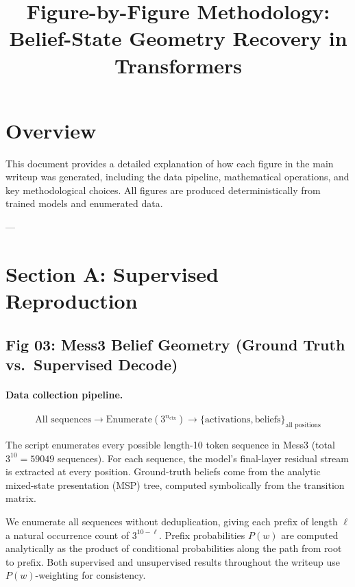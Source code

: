 \documentclass[11pt]{article}
\title{\vspace{-2.5em}Figure-by-Figure Methodology:\\
Belief-State Geometry Recovery in Transformers}
\author{}
\date{}
\begin{document}
\maketitle
\vspace{-3em}

\section*{Overview}

This document provides a detailed explanation of how each figure in the main writeup was generated, including the data pipeline, mathematical operations, and key methodological choices. All figures are produced deterministically from trained models and enumerated data.

---

\section{Section A: Supervised Reproduction}

\subsection{Fig 03: Mess3 Belief Geometry (Ground Truth vs.\ Supervised Decode)}

\paragraph{Data collection pipeline.}
\begin{equation}
\text{All sequences} \to \text{Enumerate}(3^{n_{\mathrm{ctx}}}) \to
\{\text{activations}, \text{beliefs}\}_{\text{all positions}}
\end{equation}

The script enumerates every possible length-10 token sequence in Mess3 (total $3^{10} = 59049$ sequences). For each sequence, the model's final-layer residual stream is extracted at every position. Ground-truth beliefs come from the analytic mixed-state presentation (MSP) tree, computed symbolically from the transition matrix.

We enumerate all sequences without deduplication, giving each prefix of length $\ell$ a natural occurrence count of $3^{10-\ell}$. Prefix probabilities $P(w)$ are computed analytically as the product of conditional probabilities along the path from root to prefix. Both supervised and unsupervised results throughout the writeup use $P(w)$-weighting for consistency.
\end{document}
